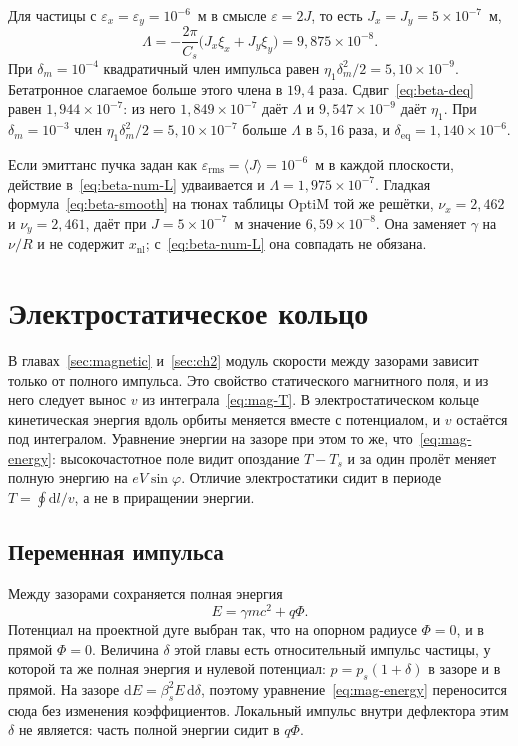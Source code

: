 \documentclass[aps,pra,preprint,a4paper,amsmath,amssymb,longbibliography]{revtex4-2}
\begin{document}
Для частицы с $\varepsilon_x=\varepsilon_y=10^{-6}$~м в смысле $\varepsilon=2J$, то есть $J_x=J_y=5\times 10^{-7}$~м,
\begin{equation}
\label{eq:beta-num-L}
\Lambda
=-\frac{2\pi}{C_s}\bigl(J_x\xi_x+J_y\xi_y\bigr)
=9{,}875\times 10^{-8}.
\end{equation}
При $\delta_m=10^{-4}$ квадратичный член импульса равен $\eta_1\delta_m^2/2=5{,}10\times 10^{-9}$. Бетатронное слагаемое больше этого члена в $19{,}4$ раза. Сдвиг~\eqref{eq:beta-deq} равен $1{,}944\times 10^{-7}$: из него $1{,}849\times 10^{-7}$ даёт $\Lambda$ и $9{,}547\times 10^{-9}$ даёт $\eta_1$. При $\delta_m=10^{-3}$ член $\eta_1\delta_m^2/2=5{,}10\times 10^{-7}$ больше $\Lambda$ в $5{,}16$ раза, и $\delta_{\mathrm{eq}}=1{,}140\times 10^{-6}$.

Если эмиттанс пучка задан как $\varepsilon_{\mathrm{rms}}=\langle J\rangle=10^{-6}$~м в каждой плоскости, действие в~\eqref{eq:beta-num-L} удваивается и $\Lambda=1{,}975\times 10^{-7}$. Гладкая формула~\eqref{eq:beta-smooth} на тюнах таблицы OptiM той же решётки, $\nu_x=2{,}462$ и $\nu_y=2{,}461$, даёт при $J=5\times 10^{-7}$~м значение $6{,}59\times 10^{-8}$. Она заменяет $\gamma$ на $\nu/R$ и не содержит $x_{\mathrm{nl}}$; с~\eqref{eq:beta-num-L} она совпадать не обязана.
\section{Электростатическое кольцо}
\label{sec:electrostatic}

В главах~\ref{sec:magnetic} и~\ref{sec:ch2} модуль скорости между зазорами зависит только от полного импульса. Это свойство статического магнитного поля, и из него следует вынос $v$ из интеграла~\eqref{eq:mag-T}. В электростатическом кольце кинетическая энергия вдоль орбиты меняется вместе с потенциалом, и $v$ остаётся под интегралом. Уравнение энергии на зазоре при этом то же, что~\eqref{eq:mag-energy}: высокочастотное поле видит опоздание $T-T_s$ и за один пролёт меняет полную энергию на $eV\sin\varphi$. Отличие электростатики сидит в периоде $T=\oint\mathrm{d}l/v$, а не в приращении энергии.

\subsection{Переменная импульса}
\label{sec:es-delta}

Между зазорами сохраняется полная энергия
\begin{equation}
\label{eq:es-energy}
E=\gamma mc^2+q\Phi.
\end{equation}
Потенциал на проектной дуге выбран так, что на опорном радиусе $\Phi=0$, и в прямой $\Phi=0$. Величина $\delta$ этой главы есть относительный импульс частицы, у которой та же полная энергия и нулевой потенциал: $p=p_s(1+\delta)$ в зазоре и в прямой. На зазоре $\mathrm{d}E=\beta_s^2 E\,\mathrm{d}\delta$, поэтому уравнение~\eqref{eq:mag-energy} переносится сюда без изменения коэффициентов. Локальный импульс внутри дефлектора этим $\delta$ не является: часть полной энергии сидит в $q\Phi$.
\end{document}
